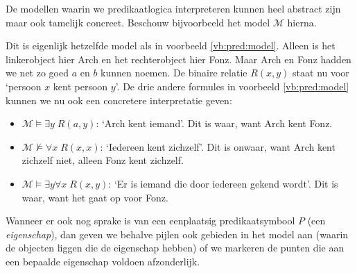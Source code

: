 \begin{example}
De modellen waarin we predikaatlogica interpreteren kunnen heel abstract zijn maar ook tamelijk concreet. Beschouw bijvoorbeeld het model $\mathcal M$ hierna.
\begin{center}
\end{center}
Dit is eigenlijk hetzelfde model als in voorbeeld \ref{vb:pred:model}. Alleen is het linkerobject hier Arch en het rechterobject hier Fonz. Maar Arch en Fonz hadden we net zo goed $a$ en $b$ kunnen noemen. De binaire relatie $R(x,y)$ staat nu voor `persoon $x$ kent persoon $y$'. De drie andere formules in voorbeeld \ref{vb:pred:model} kunnen we nu ook een concretere interpretatie geven:
\begin{itemize}
    \item $\mathcal M \vDash \exists y\;R(a,y)$: `Arch kent iemand'. Dit is waar, want Arch kent Fonz.
    \item $\mathcal M \not\vDash \forall x\;R(x,x)$: `Iedereen kent zichzelf'. Dit is onwaar, want Arch kent zichzelf niet, alleen Fonz kent zichzelf.
    \item $\mathcal M \vDash \exists y\forall x\;R(x,y)$: `Er is iemand die door iedereen gekend wordt'. Dit is waar, want het gaat op voor Fonz.
\end{itemize}
\end{example}

Wanneer er ook nog sprake is van een eenplaatsig predikaatsymbool $P$ (een \textit{eigenschap}), dan geven we behalve pijlen ook gebieden in het model aan (waarin de objecten liggen die de eigenschap hebben) of we markeren de punten die aan een bepaalde eigenschap voldoen afzonderlijk.

